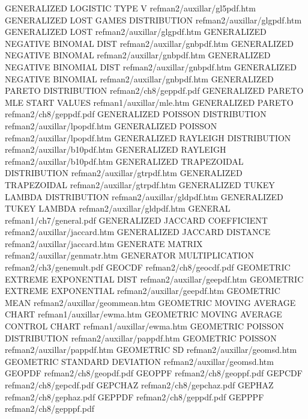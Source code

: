 GENERALIZED LOGISTIC TYPE V             refman2/auxillar/gl5pdf.htm
GENERALIZED LOST GAMES DISTRIBUTION     refman2/auxillar/glgpdf.htm
GENERALIZED LOST                        refman2/auxillar/glgpdf.htm
GENERALIZED NEGATIVE BINOMAL DIST       refman2/auxillar/gnbpdf.htm
GENERALIZED NEGATIVE BINOMAL            refman2/auxillar/gnbpdf.htm
GENERALIZED NEGATIVE BINOMIAL DIST      refman2/auxillar/gnbpdf.htm
GENERALIZED NEGATIVE BINOMIAL           refman2/auxillar/gnbpdf.htm
GENERALIZED PARETO DISTRIBUTION         refman2/ch8/geppdf.pdf
GENERALIZED PARETO MLE START VALUES     refman1/auxillar/mle.htm
GENERALIZED PARETO                      refman2/ch8/geppdf.pdf
GENERALIZED POISSON DISTRIBUTION        refman2/auxillar/lpopdf.htm
GENERALIZED POISSON                     refman2/auxillar/lpopdf.htm
GENERALIZED RAYLEIGH DISTRIBUTION       refman2/auxillar/b10pdf.htm
GENERALIZED RAYLEIGH                    refman2/auxillar/b10pdf.htm
GENERALIZED TRAPEZOIDAL DISTRIBUTION    refman2/auxillar/gtrpdf.htm
GENERALIZED TRAPEZOIDAL                 refman2/auxillar/gtrpdf.htm
GENERALIZED TUKEY LAMBDA DISTRIBUTION   refman2/auxillar/gldpdf.htm
GENERALIZED TUKEY LAMBDA                refman2/auxillar/gldpdf.htm
GENERAL                                 refman1/ch7/general.pdf
GENERALIZED JACCARD COEFFICIENT         refman2/auxillar/jaccard.htm
GENERALIZED JACCARD DISTANCE            refman2/auxillar/jaccard.htm
GENERATE MATRIX                         refman2/auxillar/genmatr.htm
GENERATOR MULTIPLICATION                refman2/ch3/genemult.pdf
GEOCDF                                  refman2/ch8/geocdf.pdf
GEOMETRIC EXTREME EXPONENTIAL DIST      refman2/auxillar/geepdf.htm
GEOMETRIC EXTREME EXPONENTIAL           refman2/auxillar/geepdf.htm
GEOMETRIC MEAN                          refman2/auxillar/geommean.htm
GEOMETRIC MOVING AVERAGE CHART          refman1/auxillar/ewma.htm
GEOMETRIC MOVING AVERAGE CONTROL CHART  refman1/auxillar/ewma.htm
GEOMETRIC POISSON DISTRIBUTION          refman2/auxillar/pappdf.htm
GEOMETRIC POISSON                       refman2/auxillar/pappdf.htm
GEOMETRIC SD                            refman2/auxillar/geomsd.htm
GEOMETRIC STANDARD DEVIATION            refman2/auxillar/geomsd.htm
GEOPDF                                  refman2/ch8/geopdf.pdf
GEOPPF                                  refman2/ch8/geoppf.pdf
GEPCDF                                  refman2/ch8/gepcdf.pdf
GEPCHAZ                                 refman2/ch8/gepchaz.pdf
GEPHAZ                                  refman2/ch8/gephaz.pdf
GEPPDF                                  refman2/ch8/geppdf.pdf
GEPPPF                                  refman2/ch8/gepppf.pdf
